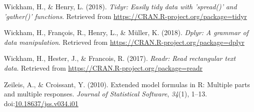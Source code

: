 \documentclass[english,man]{apa6}
\theoremstyle{definition}
\theoremstyle{definition}
\theoremstyle{definition}
\theoremstyle{remark}
\begin{document}
\hypertarget{ref-R-tidyr}{}
Wickham, H., \& Henry, L. (2018). \emph{Tidyr: Easily tidy data with
'spread()' and 'gather()' functions}. Retrieved from
\url{https://CRAN.R-project.org/package=tidyr}

\hypertarget{ref-R-dplyr}{}
Wickham, H., François, R., Henry, L., \& Müller, K. (2018). \emph{Dplyr:
A grammar of data manipulation}. Retrieved from
\url{https://CRAN.R-project.org/package=dplyr}

\hypertarget{ref-R-readr}{}
Wickham, H., Hester, J., \& Francois, R. (2017). \emph{Readr: Read
rectangular text data}. Retrieved from
\url{https://CRAN.R-project.org/package=readr}

\hypertarget{ref-R-Formula}{}
Zeileis, A., \& Croissant, Y. (2010). Extended model formulas in R:
Multiple parts and multiple responses. \emph{Journal of Statistical
Software}, \emph{34}(1), 1--13.
doi:\href{https://doi.org/10.18637/jss.v034.i01}{10.18637/jss.v034.i01}
\end{document}
